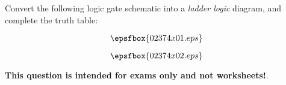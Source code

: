 

Convert the following logic gate schematic into a {\it ladder logic} diagram, and complete the truth table:

$$\epsfbox{02374x01.eps}$$







$$\epsfbox{02374x02.eps}$$







{\bf This question is intended for exams only and not worksheets!}.




